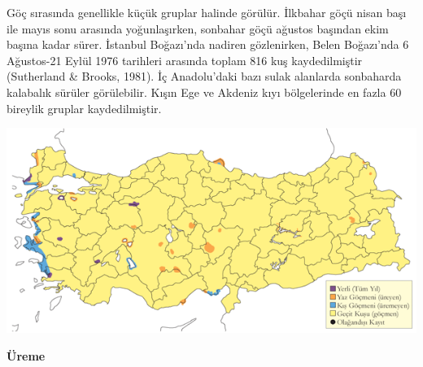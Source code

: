 \documentclass[
  a4paper,
  DIV=11,
  numbers=noendperiod]{scrreprt}
\begin{document}
Göç sırasında genellikle küçük gruplar halinde görülür. İlkbahar göçü
nisan başı ile mayıs sonu arasında yoğunlaşırken, sonbahar göçü ağustos
başından ekim başına kadar sürer. İstanbul Boğazı'nda nadiren
gözlenirken, Belen Boğazı'nda 6 Ağustos-21 Eylül 1976 tarihleri arasında
toplam 816 kuş kaydedilmiştir (Sutherland \& Brooks, 1981). İç
Anadolu'daki bazı sulak alanlarda sonbaharda kalabalık sürüler
görülebilir. Kışın Ege ve Akdeniz kıyı bölgelerinde en fazla 60 bireylik
gruplar kaydedilmiştir.

\includegraphics{images/harita_Page_063.png}

\textbf{Üreme}
\end{document}
